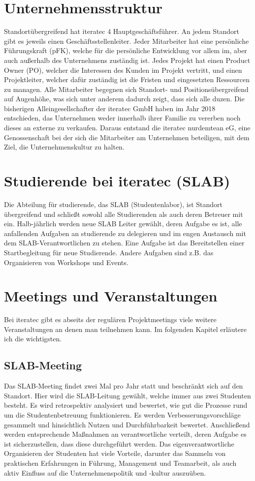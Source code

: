 \section{Unternehmensstruktur}
Standortübergreifend hat iteratec 4 Hauptgeschäftsführer. An jedem Standort gibt es jeweils einen
Geschäftsstellenleiter. Jeder Mitarbeiter hat eine persönliche Führungskraft (pFK), welche für die persönliche
Entwicklung vor allem im, aber auch außerhalb des Unternehmens zuständig ist. Jedes Projekt hat einen Product Owner
(PO), welcher die Interessen des Kunden im Projekt vertritt, und einen Projektleiter, welcher dafür zuständig ist die
Fristen und eingesetzten Ressourcen zu managen. Alle Mitarbeiter begegnen sich Standort- und Positionsübergreifend auf
Augenhöhe, was sich unter anderem dadurch zeigt, dass sich alle duzen. Die bisherigen Alleingesellschafter der iteratec
GmbH haben im Jahr 2018 entschieden, das Unternehmen weder innerhalb ihrer Familie zu vererben noch dieses an externe zu
verkaufen. Daraus entstand die iteratec nurdemtean eG, eine Genossenschaft bei der sich die Mitarbeiter am Unternehmen
beteiligen, mit dem Ziel, die Unternehmenskultur zu halten.

\section{Studierende bei iteratec (SLAB)}
Die Abteilung für studierende, das SLAB (Studentenlabor), ist Standort übergreifend und schließt sowohl alle
Studierenden als auch deren Betreuer mit ein. Halb-jährlich werden neue SLAB Leiter gewählt, deren Aufgabe es ist, alle
anfallenden Aufgaben an studierende zu delegieren und im engen Austausch mit dem SLAB-Verantwortlichen zu stehen. Eine
Aufgabe ist das Bereitstellen einer Startbegleitung für neue Studierende. Andere Aufgaben sind z.B. das Organisieren von
Workshops und Events.

\section{Meetings und Veranstaltungen}
Bei iteratec gibt es abseits der regulären Projektmeetings viele weitere Veranstaltungen an denen man teilnehmen kann.
Im folgenden Kapitel erläutere ich die wichtigsten.

\subsection{SLAB-Meeting}
Das SLAB-Meeting findet zwei Mal pro Jahr statt und beschränkt sich auf den Standort. Hier wird die SLAB-Leitung
gewählt, welche immer aus zwei Studenten besteht. Es wird retrospektiv analysiert und bewertet, wie gut die Prozesse rund um
die Studentenbetreuung funktionieren. Es werden Verbesserungsvorschläge gesammelt und hinsichtlich Nutzen und Durchführbarkeit
bewertet. Anschließend werden entsprechende Maßnahmen an verantwortliche verteilt, deren Aufgabe es ist sicherzustellen, dass diese
durchgeführt werden. Das eigenverantwortliche Organisieren der Studenten hat viele Vorteile, darunter das Sammeln von
praktischen Erfahrungen in Führung, Management und Teamarbeit, als auch aktiv Einfluss auf die
Unternehmenspolitik und -kultur auszuüben.

